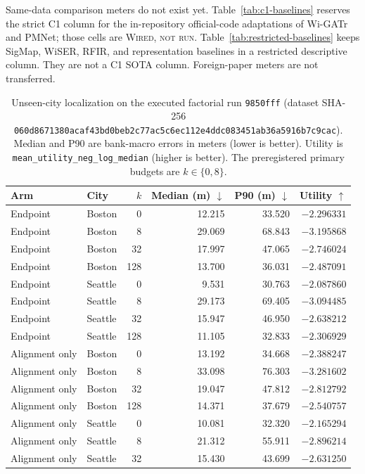 \documentclass{article}
\newcommand{\wired}{\textsc{Wired, not run}}
\begin{document}
Same-data comparison meters do not exist yet.  Table~\ref{tab:c1-baselines}
reserves the strict C1 column for the in-repository official-code
adaptations of Wi-GATr and PMNet; those cells are \wired{}.
Table~\ref{tab:restricted-baselines} keeps SigMap, WiSER, RFIR, and
representation baselines in a restricted descriptive column.  They are not
a C1 SOTA column.  Foreign-paper meters are not transferred.

\begin{table}[h]
\caption{Unseen-city localization on the executed factorial run
\texttt{9850fff} (dataset SHA-256
\texttt{060d8671380acaf43bd0beb2c77ac5c6ec112e4ddc083451ab36a5916b7c9cac}).
Median and P90 are bank-macro errors in meters (lower is better).  Utility
is \texttt{mean\_utility\_neg\_log\_median} (higher is better).  The
preregistered primary budgets are $k\in\{0,8\}$.}
\label{tab:localization}
\centering
\footnotesize
\begin{tabular}{llrrrr}
\toprule
Arm & City & $k$ & Median (m) $\downarrow$ & P90 (m) $\downarrow$ & Utility $\uparrow$ \\
\midrule
Endpoint & Boston & 0 & 12.215 & 33.520 & $-2.296331$ \\
Endpoint & Boston & 8 & 29.069 & 68.843 & $-3.195868$ \\
Endpoint & Boston & 32 & 17.997 & 47.065 & $-2.746024$ \\
Endpoint & Boston & 128 & 13.700 & 36.031 & $-2.487091$ \\
Endpoint & Seattle & 0 & 9.531 & 30.763 & $-2.087860$ \\
Endpoint & Seattle & 8 & 29.173 & 69.405 & $-3.094485$ \\
Endpoint & Seattle & 32 & 15.947 & 46.950 & $-2.638212$ \\
Endpoint & Seattle & 128 & 11.105 & 32.833 & $-2.306929$ \\
Alignment only & Boston & 0 & 13.192 & 34.668 & $-2.388247$ \\
Alignment only & Boston & 8 & 33.098 & 76.303 & $-3.281602$ \\
Alignment only & Boston & 32 & 19.047 & 47.812 & $-2.812792$ \\
Alignment only & Boston & 128 & 14.371 & 37.679 & $-2.540757$ \\
Alignment only & Seattle & 0 & 10.081 & 32.320 & $-2.165294$ \\
Alignment only & Seattle & 8 & 21.312 & 55.911 & $-2.896214$ \\
Alignment only & Seattle & 32 & 15.430 & 43.699 & $-2.631250$ \\

\end{tabular}
\end{table}
\end{document}
